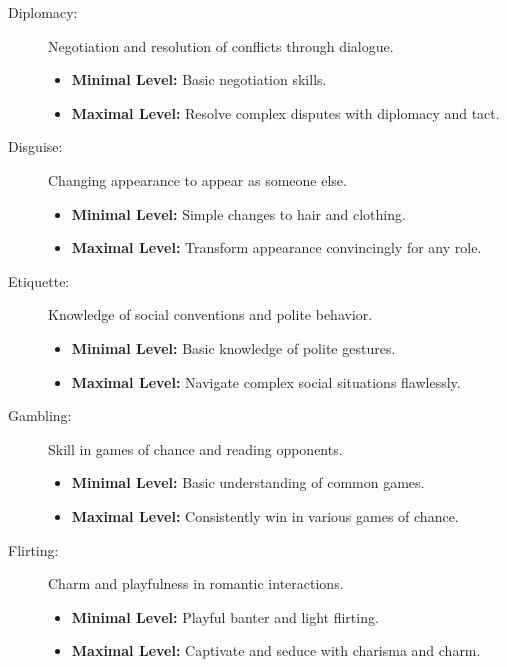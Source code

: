 \documentclass[12pt]{book}
\begin{document}
\begin{description}
    \item[Diplomacy:] Negotiation and resolution of conflicts through dialogue.
        \begin{itemize}
            \item \textbf{Minimal Level:} Basic negotiation skills.
            \item \textbf{Maximal Level:} Resolve complex disputes with diplomacy and tact.
        \end{itemize}

    \item[Disguise:] Changing appearance to appear as someone else.
        \begin{itemize}
            \item \textbf{Minimal Level:} Simple changes to hair and clothing.
            \item \textbf{Maximal Level:} Transform appearance convincingly for any role.
        \end{itemize}

    \item[Etiquette:] Knowledge of social conventions and polite behavior.
        \begin{itemize}
            \item \textbf{Minimal Level:} Basic knowledge of polite gestures.
            \item \textbf{Maximal Level:} Navigate complex social situations flawlessly.
        \end{itemize}

    \item[Gambling:] Skill in games of chance and reading opponents.
        \begin{itemize}
            \item \textbf{Minimal Level:} Basic understanding of common games.
            \item \textbf{Maximal Level:} Consistently win in various games of chance.
        \end{itemize}

    \item[Flirting:] Charm and playfulness in romantic interactions.
        \begin{itemize}
            \item \textbf{Minimal Level:} Playful banter and light flirting.
            \item \textbf{Maximal Level:} Captivate and seduce with charisma and charm.
        \end{itemize}


\end{description}
\end{document}

